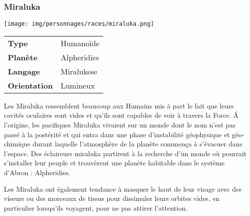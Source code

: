 \subsubsection{Miraluka}
\begin{samepage}
	\vspace{-2\baselineskip}
	\texttt{[image: img/personnages/races/miraluka.png]}

	\vspace{-5\baselineskip}

	\begin{flushright}
		\begin{tabular}{ l l }
			\textbf{Type} 			& Humanoïde \\
		   	\textbf{Planète} 		& Alpheridies \\
		   	\textbf{Langage} 		& Miralukese \\
		   	\textbf{Orientation} 	& Lumineux \\
		\end{tabular}
	\end{flushright}
\end{samepage}

Les Miraluka ressemblent beaucoup aux Humains mis à part le fait que leurs cavités oculaires sont vides et qu’ils sont capables de voir à travers la Force. \'A l’origine, les pacifiques Miraluka vivaient sur un monde dont le nom n’est pas passé à la postérité et qui entra dans une phase d’instabilité géophysique et géo-chimique durant laquelle l’atmosphère de la planète commença à s’évacuer dans l’espace. Des éclaireurs miraluka partirent à la recherche d’un monde où pourrait s’installer leur peuple et trouvèrent une planète habitable dans le système d’Abron : Alpheridies. 

Les Miraluka ont également tendance à masquer le haut de leur visage avec des viseurs ou des morceaux de tissus pour dissimuler leurs orbites vides, en particulier lorsqu’ils voyagent, pour ne pas attirer l’attention.


